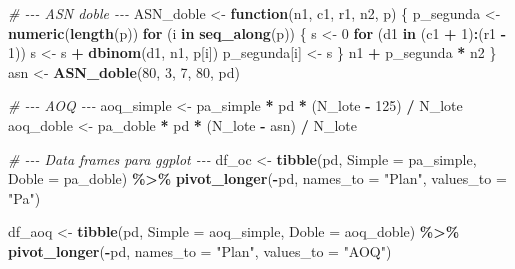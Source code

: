 \documentclass[
  12pt,
]{article}
\newenvironment{Shaded}{\begin{snugshade}}{\end{snugshade}}
\newcommand{\AttributeTok}[1]{\textcolor[rgb]{0.13,0.29,0.53}{#1}}
\newcommand{\CommentTok}[1]{\textcolor[rgb]{0.56,0.35,0.01}{\textit{#1}}}
\newcommand{\ControlFlowTok}[1]{\textcolor[rgb]{0.13,0.29,0.53}{\textbf{#1}}}
\newcommand{\DecValTok}[1]{\textcolor[rgb]{0.00,0.00,0.81}{#1}}
\newcommand{\FunctionTok}[1]{\textcolor[rgb]{0.13,0.29,0.53}{\textbf{#1}}}
\newcommand{\NormalTok}[1]{#1}
\newcommand{\OtherTok}[1]{\textcolor[rgb]{0.56,0.35,0.01}{#1}}
\newcommand{\SpecialCharTok}[1]{\textcolor[rgb]{0.81,0.36,0.00}{\textbf{#1}}}
\newcommand{\StringTok}[1]{\textcolor[rgb]{0.31,0.60,0.02}{#1}}
\begin{document}
\begin{Shaded}
\begin{Highlighting}[]
\CommentTok{\# {-}{-}{-} ASN doble {-}{-}{-}}
\NormalTok{ASN\_doble }\OtherTok{\textless{}{-}} \ControlFlowTok{function}\NormalTok{(n1, c1, r1, n2, p) \{}
\NormalTok{  p\_segunda }\OtherTok{\textless{}{-}} \FunctionTok{numeric}\NormalTok{(}\FunctionTok{length}\NormalTok{(p))}
  \ControlFlowTok{for}\NormalTok{ (i }\ControlFlowTok{in} \FunctionTok{seq\_along}\NormalTok{(p)) \{}
\NormalTok{    s }\OtherTok{\textless{}{-}} \DecValTok{0}
    \ControlFlowTok{for}\NormalTok{ (d1 }\ControlFlowTok{in}\NormalTok{ (c1 }\SpecialCharTok{+} \DecValTok{1}\NormalTok{)}\SpecialCharTok{:}\NormalTok{(r1 }\SpecialCharTok{{-}} \DecValTok{1}\NormalTok{))}
\NormalTok{      s }\OtherTok{\textless{}{-}}\NormalTok{ s }\SpecialCharTok{+} \FunctionTok{dbinom}\NormalTok{(d1, n1, p[i])}
\NormalTok{    p\_segunda[i] }\OtherTok{\textless{}{-}}\NormalTok{ s}
\NormalTok{  \}}
\NormalTok{  n1 }\SpecialCharTok{+}\NormalTok{ p\_segunda }\SpecialCharTok{*}\NormalTok{ n2}
\NormalTok{\}}
\NormalTok{asn }\OtherTok{\textless{}{-}} \FunctionTok{ASN\_doble}\NormalTok{(}\DecValTok{80}\NormalTok{, }\DecValTok{3}\NormalTok{, }\DecValTok{7}\NormalTok{, }\DecValTok{80}\NormalTok{, pd)}

\CommentTok{\# {-}{-}{-} AOQ {-}{-}{-}}
\NormalTok{aoq\_simple }\OtherTok{\textless{}{-}}\NormalTok{ pa\_simple }\SpecialCharTok{*}\NormalTok{ pd }\SpecialCharTok{*}\NormalTok{ (N\_lote }\SpecialCharTok{{-}} \DecValTok{125}\NormalTok{) }\SpecialCharTok{/}\NormalTok{ N\_lote}
\NormalTok{aoq\_doble  }\OtherTok{\textless{}{-}}\NormalTok{ pa\_doble  }\SpecialCharTok{*}\NormalTok{ pd }\SpecialCharTok{*}\NormalTok{ (N\_lote }\SpecialCharTok{{-}}\NormalTok{ asn)  }\SpecialCharTok{/}\NormalTok{ N\_lote}

\CommentTok{\# {-}{-}{-} Data frames para ggplot {-}{-}{-}}
\NormalTok{df\_oc  }\OtherTok{\textless{}{-}} \FunctionTok{tibble}\NormalTok{(pd, }\AttributeTok{Simple =}\NormalTok{ pa\_simple, }\AttributeTok{Doble =}\NormalTok{ pa\_doble) }\SpecialCharTok{\%\textgreater{}\%}
            \FunctionTok{pivot\_longer}\NormalTok{(}\SpecialCharTok{{-}}\NormalTok{pd, }\AttributeTok{names\_to =} \StringTok{"Plan"}\NormalTok{, }\AttributeTok{values\_to =} \StringTok{"Pa"}\NormalTok{)}

\NormalTok{df\_aoq }\OtherTok{\textless{}{-}} \FunctionTok{tibble}\NormalTok{(pd, }\AttributeTok{Simple =}\NormalTok{ aoq\_simple, }\AttributeTok{Doble =}\NormalTok{ aoq\_doble) }\SpecialCharTok{\%\textgreater{}\%}
            \FunctionTok{pivot\_longer}\NormalTok{(}\SpecialCharTok{{-}}\NormalTok{pd, }\AttributeTok{names\_to =} \StringTok{"Plan"}\NormalTok{, }\AttributeTok{values\_to =} \StringTok{"AOQ"}\NormalTok{)}


\end{Highlighting}
\end{Shaded}
\end{document}
